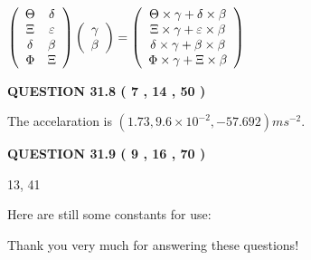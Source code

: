 \documentclass[12pt]{article}
\begin{document}
$  %
 \left( \begin{array}
 {
 c
 c
 }
 \Theta & 
 \delta \\ 
                    \Xi & 
 \varepsilon \\ 
 \delta & 
 \beta \\ 
 \Phi & 
                    \Xi
 \end{array} \right)
 \left( \begin{array}
 {
 c
 }
 \gamma \\ 
 \beta
 \end{array} \right)
=
 \left( \begin{array}
 {
 c
 }
  \Theta \times  \gamma +  \delta \times  \beta \\ 
                     \Xi \times  \gamma +  \varepsilon \times  \beta \\ 
  \delta \times  \gamma +  \beta \times  \beta \\ 
  \Phi \times  \gamma +                     \Xi \times  \beta
 \end{array} \right)
$
 
 
 
  
\vspace{0.2in}
  
{\textbf{\Large{QUESTION
31.8 
 (           7 ,          14 ,          50 )
}}}
  
  
 
 
\noindent{}
 
 
  The accelaration is $  %
(
1.73,
9.6 \times 10^{-2},
-57.692)
ms^{-2} $.
 
 
 
 
  
\vspace{0.2in}
  
{\textbf{\Large{QUESTION
31.9 
 (           9 ,          16 ,          70 )
}}}
  
  


 
 
\noindent{}

13,  %
41
 
 
 
   
   
 \vspace{0.2in}
Here are still some constants for use:
 
 
 
 
Thank you very much for answering these questions!
 
\end{document}
